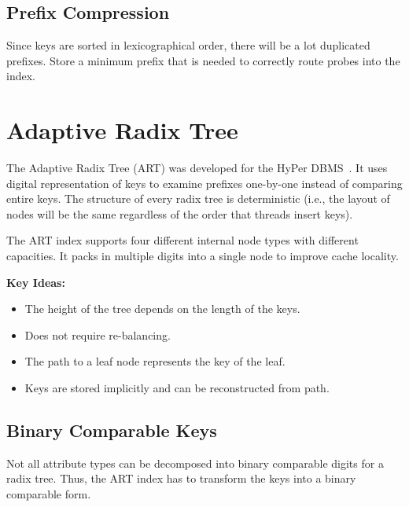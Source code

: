 \documentclass[11pt]{article}
\begin{document}
\subsection*{Prefix Compression}
Since keys are sorted in lexicographical order, there will be a lot duplicated 
prefixes. 
Store a minimum prefix that is needed to correctly route probes into the index.


\section{Adaptive Radix Tree}
The Adaptive Radix Tree (ART) was developed for the HyPer DBMS~\cite{leis-icde2013}.
It uses digital representation of keys to examine prefixes one-by-one instead of comparing entire 
keys. The structure of every radix tree is deterministic (i.e., the layout of nodes will be the 
same regardless of the order that threads insert keys).

The ART index supports four different internal node types with different capacities. It packs in 
multiple digits into a single node to improve cache locality.

\textbf{Key Ideas:}
\begin{itemize}
    \item
    The height of the tree depends on the length of the keys.
    
    \item
    Does not require re-balancing.
    
    \item
    The path to a leaf node represents the key of the leaf.
    
    \item
    Keys are stored implicitly and can be reconstructed from path.
\end{itemize}

\subsection*{Binary Comparable Keys}
Not all attribute types can be decomposed into binary comparable digits for a radix tree. Thus, the 
ART index has to transform the keys into a binary comparable form.
\end{document}
